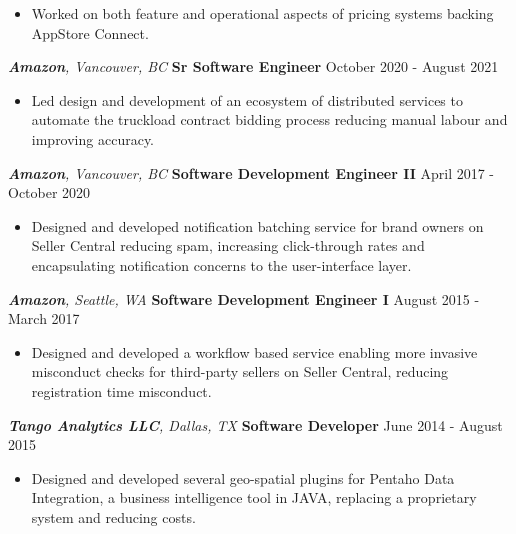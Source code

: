 \documentclass{res}
\newcommand\tab[1][1cm]{\hspace*{#1}}
\begin{document}
\begin{resume}
 \begin{itemize} \itemsep -2pt
 	\item Worked on both feature and operational aspects of pricing systems backing AppStore Connect.
\end{itemize} \vspace{-6pt}

{\sl \textbf{Amazon}, Vancouver, BC} \tab[2cm]
\textbf{Sr Software Engineer} \hfill    October 2020 - August 2021

 \begin{itemize} \itemsep -2pt
 	\item Led design and development of an ecosystem of distributed services to automate the truckload contract bidding process reducing manual labour and improving accuracy.
\end{itemize} \vspace{-6pt}

{\sl \textbf{Amazon}, Vancouver, BC} \tab[2cm]
\textbf{Software Development Engineer II} \hfill    April 2017 - October 2020

 \begin{itemize} \itemsep -2pt
  \item Designed and developed notification batching service for brand owners on Seller Central reducing spam,  increasing click-through rates and encapsulating notification concerns to the user-interface layer.
\end{itemize} \vspace{-6pt}

{\sl \textbf{Amazon}, Seattle, WA} \tab[2cm]
\textbf{Software Development Engineer I} \hfill    August 2015 - March 2017

 \begin{itemize} \itemsep -2pt
  \item  Designed and developed a workflow based service enabling more invasive misconduct checks for third-party sellers on Seller Central,  reducing registration time misconduct. 
\end{itemize} \vspace{-6pt}

{\sl \textbf{Tango Analytics LLC}, Dallas, TX} \tab[2cm]
\textbf{Software Developer} \hfill    June 2014 - August 2015

 \begin{itemize} \itemsep -2pt
  \item  Designed and developed several geo-spatial plugins for Pentaho Data Integration, a business intelligence tool in JAVA, replacing a proprietary system and reducing costs.
\end{itemize} \vspace{-6pt}


\end{resume}
\end{document}
